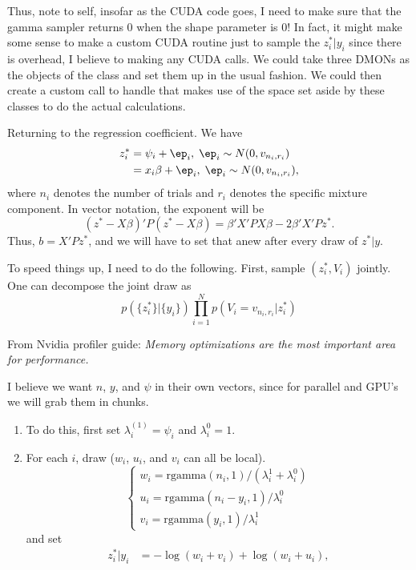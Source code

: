 \documentclass{article}
\begin{document}
Thus, note to self, insofar as the CUDA code goes, I need to make sure that the
gamma sampler returns 0 when the shape parameter is 0!  In fact, it might make
some sense to make a custom CUDA routine just to sample the $z_i^*|y_i$ since
there is overhead, I believe to making any CUDA calls.  We could take three
DMONs as the objects of the class and set them up in the usual fashion.  We
could then create a custom call to handle that makes use of the space set aside
by these classes to do the actual calculations.

Returning to the regression coefficient.  We have
\begin{align*}
z_i^* & = \psi_i + \ep_i, \; \ep_i \sim N(0, v_{n_i,r_i}) \\
& = x_i \beta + \ep_i, \; \ep_i \sim N(0, v_{n_i,r_i}) ,
\end{align*}
where $n_i$ denotes the number of trials and $r_i$ denotes the specific mixture
component.  In vector notation, the exponent will be
\[
(z^* - X \beta)' P (z^* - X \beta) = \beta' X'PX \beta - 2 \beta' X'P z^*.
\]
Thus, $b = X'Pz^*$, and we will have to set that anew after every draw of
$z^*|y$.

To speed things up, I need to do the following.  First, sample $(z_i^*,
V_i)$ jointly.  One can decompose the joint draw as
\[
p(\{z_i^*\} | \{y_i\}) \prod_{i=1}^N p(V_i = v_{n_i,r_i} | z_i^*)
\]

From Nvidia profiler guide: \emph{Memory optimizations are the most important
  area for performance.}

I believe we want $n$, $y$, and $\psi$ in their own vectors, since for parallel
and GPU's we will grab them in chunks.
\begin{enumerate}
\item To do this, first set $\lambda_i^{(1)} = \psi_i$ and $\lambda_i^0 = 1$.

\item For each $i$, draw ($w_i$, $u_i$, and $v_i$ can all be local).
\[
\begin{cases}
w_i = \text{rgamma}(n_i,1) / (\lambda_i^1 + \lambda_i^0) \\
u_i = \text{rgamma}(n_i-y_i, 1) / \lambda_i^0 \\
v_i = \text{rgamma}(y_i, 1) / \lambda_i^1
\end{cases}
\]
and set
\begin{align*}
z_i^*|y_i 
& = - \log(w_i + v_i) + \log(w_i + u_i),
\end{align*}

\end{enumerate}
\end{document}
